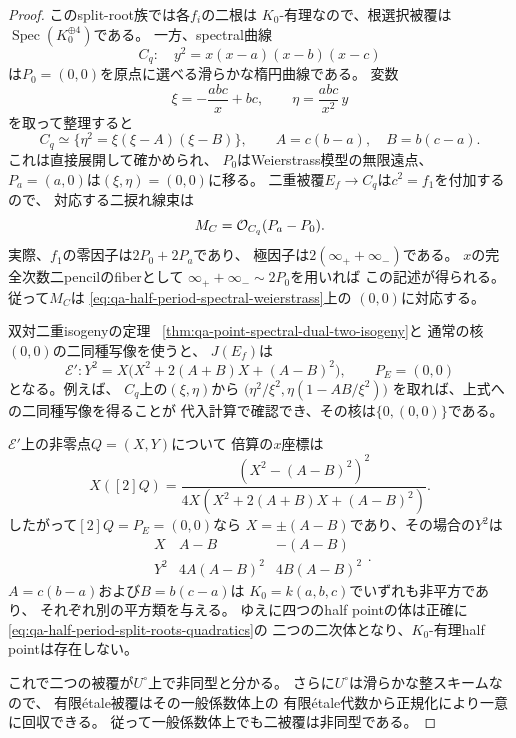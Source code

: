 \begin{proof}
このsplit-root族では各$f_i$の二根は
$K_0$-有理なので、根選択被覆は
$\operatorname{Spec}(K_0^{\oplus4})$である。
一方、spectral曲線
\[
 C_q:\quad y^2=x(x-a)(x-b)(x-c)
\]
は$P_0=(0,0)$を原点に選べる滑らかな楕円曲線である。
変数
\[
 \xi=-\frac{abc}{x}+bc,\qquad
 \eta=\frac{abc}{x^2}\,y
\]
を取って整理すると
\begin{equation}
 C_q\simeq
 \{\eta^2=\xi(\xi-A)(\xi-B)\},\qquad
 A=c(b-a),\quad B=b(c-a).
 \label{eq:qa-half-period-spectral-weierstrass}
\end{equation}
これは直接展開して確かめられ、
$P_0$はWeierstrass模型の無限遠点、
$P_a=(a,0)$は$(\xi,\eta)=(0,0)$に移る。
二重被覆$E_f\to C_q$は$c^2=f_1$を付加するので、
対応する二捩れ線束は
\[
 M_C=\mathcal O_{C_q}(P_a-P_0).
\]
実際、$f_1$の零因子は$2P_0+2P_a$であり、
極因子は$2(\infty_++\infty_-)$である。
$x$の完全次数二pencilのfiberとして
$\infty_++\infty_-\sim2P_0$を用いれば
この記述が得られる。
従って$M_C$は
\eqref{eq:qa-half-period-spectral-weierstrass}上の
$(0,0)$に対応する。

双対二重isogenyの定理
~\ref{thm:qa-point-spectral-dual-two-isogeny}と
通常の核$(0,0)$の二同種写像を使うと、
$J(E_f)$は
\begin{equation}
 \mathcal E':
 Y^2=X\bigl(X^2+2(A+B)X+(A-B)^2\bigr),
 \qquad
 P_E=(0,0)
 \label{eq:qa-half-period-isogenous-model}
\end{equation}
となる。例えば、
$C_q$上の$(\xi,\eta)$から
$\bigl(\eta^2/\xi^2,\eta(1-AB/\xi^2)\bigr)$
を取れば、上式への二同種写像を得ることが
代入計算で確認でき、その核は$\{0,(0,0)\}$である。

$\mathcal E'$上の非零点$Q=(X,Y)$について
倍算の$x$座標は
\[
 X([2]Q)=
 \frac{(X^2-(A-B)^2)^2}
 {4X(X^2+2(A+B)X+(A-B)^2)} .
\]
したがって$[2]Q=P_E=(0,0)$なら
$X=\pm(A-B)$であり、その場合の$Y^2$は
\[
 \begin{array}{c|cc}
 X&A-B&-(A-B)\\\hline
 Y^2&4A(A-B)^2&4B(A-B)^2
 \end{array}.
\]
$A=c(b-a)$および$B=b(c-a)$は
$K_0=k(a,b,c)$でいずれも非平方であり、
それぞれ別の平方類を与える。
ゆえに四つのhalf pointの体は正確に
\eqref{eq:qa-half-period-split-roots-quadratics}の
二つの二次体となり、$K_0$-有理half pointは存在しない。

これで二つの被覆が$U^\circ$上で非同型と分かる。
さらに$U^\circ$は滑らかな整スキームなので、
有限\'{e}tale被覆はその一般係数体上の
有限\'{e}tale代数から正規化により一意に回収できる。
従って一般係数体上でも二被覆は非同型である。
\end{proof}

